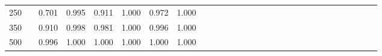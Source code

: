 % 
\begin{tabular}{ccccccccccccccccccccccccccccc}
  \hline
  \hline
250 &  & 0.701 & 0.995 & 0.911 & 1.000 & 0.972 & 1.000 &  &  &  &  &  &  &  &  &  &  &  &  &  &  &  &  &  &  &  &  &  \\ 
  350 &  & 0.910 & 0.998 & 0.981 & 1.000 & 0.996 & 1.000 &  &  &  &  &  &  &  &  &  &  &  &  &  &  &  &  &  &  &  &  &  \\ 
  500 &  & 0.996 & 1.000 & 1.000 & 1.000 & 1.000 & 1.000 &  &  &  &  &  &  &  &  &  &  &  &  &  &  &  &  &  &  &  &  &  \\ 
   \hline
\end{tabular}
